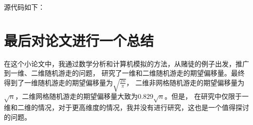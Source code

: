 \documentclass{article}
\newcommand\f[2]{\frac{#1}{#2}}
\begin{document}
源代码如下：



\section{最后对论文进行一个总结}

在这个小论文中，我通过数学分析和计算机模拟的方法，从赌徒的例子出发，推广到一维、二维随机游走的问题，
研究了一维和二维随机游走的期望偏移量。最终得到了一维随机游走的期望偏移量为$\sqrt{\f{2n}{\pi}}$，
二维非网格随机游走的期望偏移量为$\sqrt{n}$，二维网格随机游走的期望偏移量大致为$0.829\sqrt{n}$。但是，
在研究中仅限于一维和二维的情况，对于更高维度的情况，我并没有进行研究，这也是一个值得探讨的问题。




\end{document}

